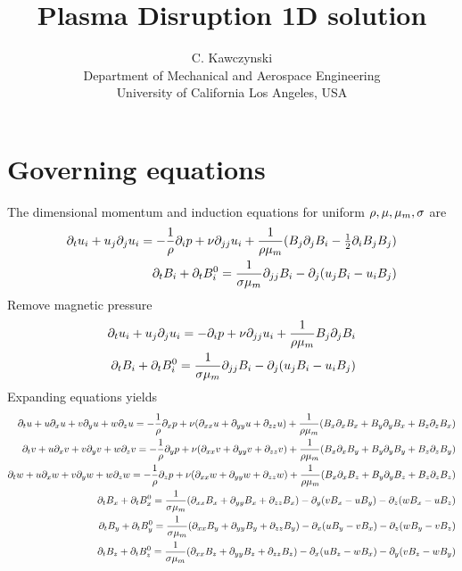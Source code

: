 \documentclass[11pt]{article}
\begin{document}
\doublespacing
\title{Plasma Disruption 1D solution}
\author{C. Kawczynski \\
Department of Mechanical and Aerospace Engineering \\
University of California Los Angeles, USA\\
}
\maketitle

\section{Governing equations}
The dimensional momentum and induction equations for uniform $\rho,\mu,{\mu_m},\sigma$ are
\begin{equation}\begin{aligned}
\partial_t u_i+u_j\partial_j u_i = - \frac{1}{\rho} \partial_i p+ \nu \partial_{jj} u_i + \frac{1}{\rho {\mu_m}} (B_j \partial_j B_i - \tfrac{1}{2} \partial_i B_j B_j) \\
\partial_t B_i + \partial_t B_i^0 = \frac{1}{\sigma {\mu_m}} \partial_{jj} B_i - \partial_j (u_j B_i - u_i B_j)
\end{aligned} \end{equation}
Remove magnetic pressure
\begin{equation}\begin{aligned}
\partial_t u_i+u_j\partial_j u_i = -\partial_i p+ \nu \partial_{jj} u_i + \frac{1}{\rho {\mu_m}} B_j \partial_j B_i \\
\partial_t B_i + \partial_t B_i^0 = \frac{1}{\sigma {\mu_m}} \partial_{jj} B_i - \partial_j (u_j B_i - u_i B_j)
\end{aligned} \end{equation}
Expanding equations yields
\begin{equation}\begin{aligned}
\partial_t u+ u\partial_x u + v\partial_y u + w\partial_z u = -\frac{1}{\rho}\partial_x p+ \nu (\partial_{xx} u+\partial_{yy} u+\partial_{zz} u) + \frac{1}{\rho {\mu_m}} (B_x \partial_x B_x + B_y \partial_y B_x + B_z \partial_z B_x) \\
\partial_t v+ u\partial_x v + v\partial_y v + w\partial_z v = -\frac{1}{\rho}\partial_y p+ \nu (\partial_{xx} v+\partial_{yy} v+\partial_{zz} v) + \frac{1}{\rho {\mu_m}} (B_x \partial_x B_y + B_y \partial_y B_y + B_z \partial_z B_y) \\
\partial_t w+ u\partial_x w + v\partial_y w + w\partial_z w = -\frac{1}{\rho}\partial_z p+ \nu (\partial_{xx} w+\partial_{yy} w+\partial_{zz} w) + \frac{1}{\rho {\mu_m}} (B_x \partial_x B_z + B_y \partial_y B_z + B_z \partial_z B_z) \\
\partial_t B_x + \partial_t B_x^0 = \frac{1}{\sigma {\mu_m}} (\partial_{xx} B_x + \partial_{yy} B_x+\partial_{zz} B_x)                         - \partial_y (v B_x - u B_y) - \partial_z (w B_x - u B_z) \\
\partial_t B_y + \partial_t B_y^0 = \frac{1}{\sigma {\mu_m}} (\partial_{xx} B_y + \partial_{yy} B_y+\partial_{zz} B_y) - \partial_x (u B_y - v B_x)                         - \partial_z (w B_y - v B_z) \\
\partial_t B_z + \partial_t B_z^0 = \frac{1}{\sigma {\mu_m}} (\partial_{xx} B_z + \partial_{yy} B_z+\partial_{zz} B_z) - \partial_x (u B_z - w B_x) - \partial_y (v B_z - w B_y)                         \\
\end{aligned} \end{equation}
\end{document}
